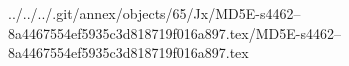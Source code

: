../../../.git/annex/objects/65/Jx/MD5E-s4462--8a4467554ef5935c3d818719f016a897.tex/MD5E-s4462--8a4467554ef5935c3d818719f016a897.tex